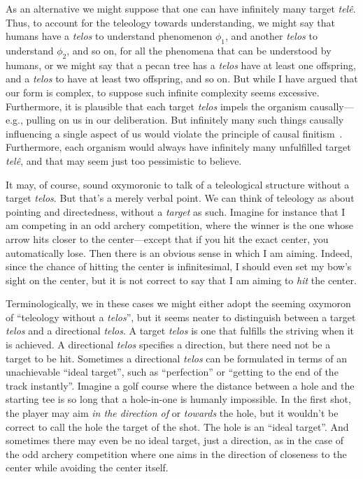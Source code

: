As an alternative we might suppose that one can have infinitely many target \textit{tel\^e}. Thus, to account
for the teleology towards understanding, we might say that humans have a \textit{telos} to understand
phenomenon $\phi_1$, and another \textit{telos} to understand $\phi_2$, and so on, for all the phenomena that can be understood by humans, or we might say that a pecan tree has a \textit{telos} have
at least one offspring, and a \textit{telos} to have at least two offspring, and so on. But while I have argued that our form is 
complex, to suppose such infinite complexity seems excessive. Furthermore, it is plausible that each target \textit{telos} impels the organism
causally---e.g., pulling on us in our deliberation. But infinitely many such things causally influencing a single aspect of us would violate 
the principle of causal finitism~\parencite{KoonsKalaam,PrussInfinity}. Furthermore, each organism would always have infinitely 
many unfulfilled target \textit{tel\^e}, and that may seem just too pessimistic to believe.

It may, of course, sound oxymoronic to talk of a teleological structure without a target \textit{telos}. But that's a merely verbal point. We can
think of teleology as about pointing and directedness, without a \textit{target} as such. Imagine for instance that I am competing in an 
odd archery competition, where the winner is the one whose arrow hits closer to the center---except that if you hit the exact center, you
automatically lose. Then there is an obvious sense in which I am aiming. Indeed, since the chance of hitting the center is infinitesimal,
I should even set my bow's sight on the center, but it is not correct to say that I am aiming to \textit{hit} the center. 

Terminologically, we in these cases we might either adopt the seeming oxymoron of ``teleology without a \textit{telos}'', but it seems neater to distinguish between a target \textit{telos} and a directional \textit{telos}. A target \textit{telos} is
one that fulfills the striving when it is achieved. A directional \textit{telos} specifies a direction, but there need
not be a target to be hit. Sometimes a directional \textit{telos} can be formulated in terms of an unachievable 
``ideal target'', such as ``perfection'' or ``getting to the end of the track instantly''.  Imagine a golf course 
where the distance between a hole and the starting tee is so long that  a hole-in-one is humanly impossible. In the
first shot, the player may aim \textit{in the direction of} or \textit{towards} the hole, but it wouldn't be correct
to call the hole the target of the shot. The hole is an ``ideal target''. And sometimes there may even be no ideal target, just a direction, as in the case of the odd archery competition where one aims in the direction of closeness to the 
center while avoiding the center itself. 

